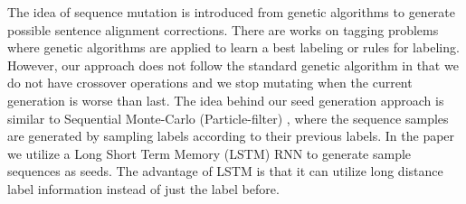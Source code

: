 \documentclass[11pt]{article}
\begin{document}
The idea of sequence mutation is introduced from genetic  algorithms to generate possible sentence alignment corrections. There are works on tagging problems \cite{araujo2002part,alba2006natural,silva2013new} where genetic algorithms are applied to learn a best labeling or rules for labeling. However, our approach does not follow the standard genetic algorithm in that we do not have crossover operations and we stop mutating when the current generation is worse than last. The idea behind our seed generation approach is similar to Sequential Monte-Carlo (Particle-filter) \cite{khan2004mcmc}, where the sequence samples are generated by sampling labels according to their previous labels. In the paper we utilize a Long Short Term Memory (LSTM) \cite{hochreiter1997long} RNN to generate sample sequences as seeds. The advantage of  LSTM is that it can utilize long distance label information instead of just the label before. 



\end{document}
